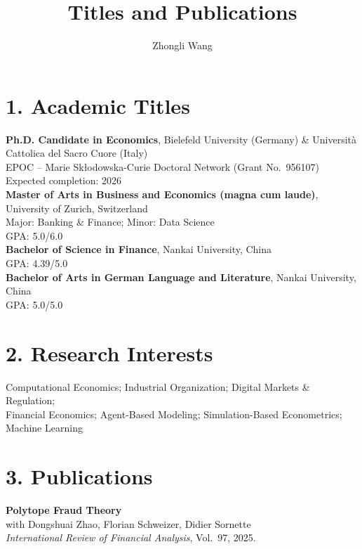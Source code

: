 \documentclass{nfr}
\title{Titles and Publications}
\author{Zhongli Wang}
\begin{document}
\maketitle

\section*{1. Academic Titles}

\textbf{Ph.D. Candidate in Economics}, Bielefeld University (Germany) \& Università Cattolica del Sacro Cuore (Italy) \\
EPOC -- Marie Skłodowska-Curie Doctoral Network (Grant No.~956107) \\
Expected completion: 2026\\

\textbf{Master of Arts in Business and Economics (magna cum laude)}, University of Zurich, Switzerland\\
Major: Banking \& Finance; Minor: Data Science\\
GPA: 5.0/6.0\\

\textbf{Bachelor of Science in Finance}, Nankai University, China \\
GPA: 4.39/5.0\\

\textbf{Bachelor of Arts in German Language and Literature}, Nankai University, China \\
GPA: 5.0/5.0

\section*{2. Research Interests}

Computational Economics; Industrial Organization; Digital Markets \& Regulation; \\
Financial Economics; Agent-Based Modeling; Simulation-Based Econometrics; Machine Learning

\section*{3. Publications}

\textbf{Polytope Fraud Theory} \\
with Dongshuai Zhao, Florian Schweizer, Didier Sornette \\
\textit{International Review of Financial Analysis}, Vol.~97, 2025.
\end{document}

